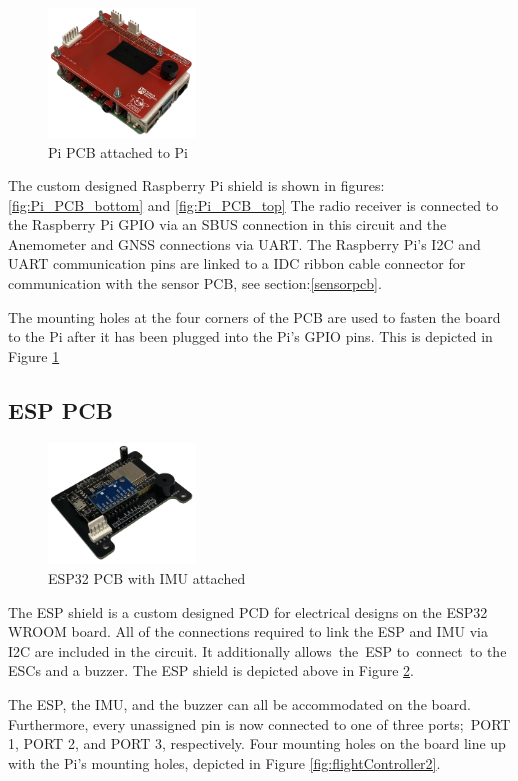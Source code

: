 \documentclass{report}
\begin{document}
\begin{figure}[H]
  \centering
  \includegraphics[width=0.35\textwidth]{Pictures/Pi_PCB_on_Pi.png}
  \caption{Pi PCB attached to Pi}
  \label{fig:Pi_PCB_on_Pi}
\end{figure}
The custom designed Raspberry Pi shield is shown in
figures:\ref{fig:Pi_PCB_bottom} and \ref{fig:Pi_PCB_top} The radio receiver is
connected to the Raspberry Pi GPIO via an SBUS connection in this circuit and
the Anemometer and GNSS connections via UART. The Raspberry Pi's I2C and UART
communication pins are linked to a IDC ribbon cable connector for communication
with the sensor PCB, see section:\ref{sensorpcb}.

The mounting holes at the four corners of the PCB are used to fasten the board
to the Pi after it has been plugged into the Pi's GPIO pins. This is depicted in
Figure \ref{fig:Pi_PCB_on_Pi}

\subsection{ESP PCB}
\begin{figure}[H]
  \centering
  \includegraphics[width=0.35\textwidth]{Pictures/Esp_IMU_board.png}
  \caption{ESP32 PCB with IMU attached}
  \label{fig:Esp_IMU_PCB}
\end{figure}
The ESP shield is a custom designed PCD for electrical designs on the ESP32
WROOM board. All of the connections required to link the ESP and IMU via I2C are
included in the circuit. It additionally allows the ESP to connect to the ESCs
and a buzzer. The ESP shield is depicted above in Figure \ref{fig:Esp_IMU_PCB}.

The ESP, the IMU, and the buzzer can all be accommodated on the board.
Furthermore, every unassigned pin is now connected to one of three ports; PORT
1, PORT 2, and PORT 3, respectively. Four mounting holes on the board line up
with the Pi's mounting holes, depicted in Figure \ref{fig:flightController2}.
\end{document}
